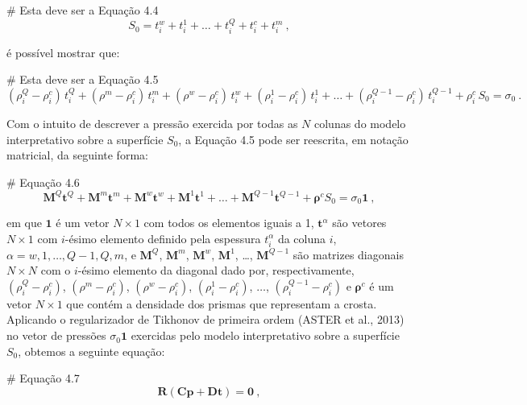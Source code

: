 \documentclass[manuscript]{geophysics}
\begin{document}
# Esta deve ser a Equação 4.4
\begin{equation}
S_{0} = t^{w}_{i} + t^{1}_{i} + \dots + t^{Q}_{i} + t^{c}_{i} + t^{m}_{i} \: ,
\end{equation}

é possível mostrar que:

# Esta deve ser a Equação 4.5
\begin{equation}
(\rho^{Q}_{i} - \rho^{c}_{i}) \, t^{Q}_{i} + (\rho^{m} - \rho^{c}_{i}) \, t^{m}_{i} + (\rho^{w} - \rho^{c}_{i}) \, t^{w}_{i} + (\rho^{1}_{i} - \rho^{c}_{i}) \, t^{1}_{i} + \dots + (\rho^{Q-1}_{i} - \rho^{c}_{i}) \, t^{Q-1}_{i} + \rho^{c}_{i} \, S_{0} = \sigma_{0} \: .
\end{equation}

Com o intuito de descrever a pressão exercida por todas as $N$ colunas do modelo interpretativo sobre a superfície $S_{0}$, a Equação 4.5 pode ser reescrita, em notação matricial, da seguinte forma:

# Equação 4.6
\begin{equation}
\mathbf{M}^{Q} \mathbf{t}^{Q} + \mathbf{M}^{m} \mathbf{t}^{m} + \mathbf{M}^{w} \mathbf{t}^{w} + \mathbf{M}^{1} \mathbf{t}^{1} + \dots + \mathbf{M}^{Q-1} \mathbf{t}^{Q-1} + \boldsymbol{\rho}^{c} S_{0} = \sigma_{0} \mathbf{1} \: ,
\end{equation}

em que $\mathbf{1}$ é um vetor $N \times 1$ com todos os elementos iguais a 1, $\mathbf{t}^{\alpha}$ são vetores $N \times 1$ com $i$-ésimo elemento definido pela espessura $t^{\alpha}_{i}$ da coluna $i$, $\alpha = w, 1, \dots, Q-1, Q, m$, e $\mathbf{M}^{Q}$, $\mathbf{M}^{m}$, $\mathbf{M}^{w}$, $\mathbf{M}^{1}$, \dots, $\mathbf{M}^{Q-1}$ são matrizes diagonais $N \times N$ com o $i$-ésimo elemento da diagonal dado por, respectivamente, $(\rho^{Q}_{i} - \rho^{c}_{i})$, $(\rho^{m} - \rho^{c}_{i})$, $(\rho^{w} - \rho^{c}_{i})$, $(\rho^{1}_{i} - \rho^{c}_{i})$, $\dots$, $(\rho^{Q-1}_{i} - \rho^{c}_{i})$ e $\boldsymbol{\rho}^{c}$ é um vetor $N \times 1$ que contém a densidade dos prismas que representam a crosta. Aplicando o regularizador de Tikhonov de primeira ordem (ASTER et al., 2013) no vetor de pressões $\sigma_{0} \mathbf{1}$ exercidas pelo modelo interpretativo sobre a superfície $S_{0}$, obtemos a seguinte equação:

# Equação 4.7
\begin{equation}
\mathbf{R} \left( \mathbf{C} \mathbf{p} + \mathbf{D} \mathbf{t} \right) = \mathbf{0} \: ,
\end{equation}
\end{document}
